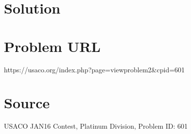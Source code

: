 \documentclass[12pt]{article}
\begin{document}
\section*{Solution}


\section*{Problem URL}
https://usaco.org/index.php?page=viewproblem2&cpid=601

\section*{Source}
USACO JAN16 Contest, Platinum Division, Problem ID: 601
\end{document}
